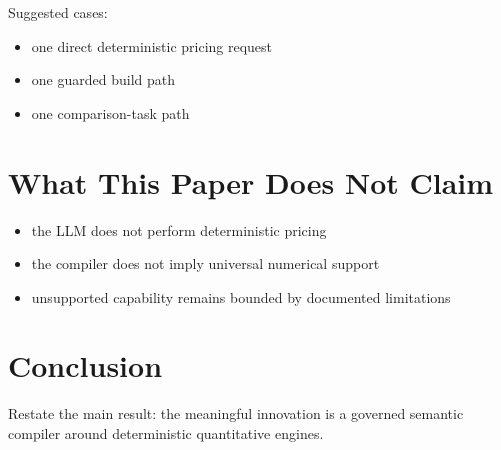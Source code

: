 \documentclass[11pt]{article}
\begin{document}
Suggested cases:
\begin{itemize}
    \item one direct deterministic pricing request
    \item one guarded build path
    \item one comparison-task path
\end{itemize}

\section{What This Paper Does Not Claim}

\begin{itemize}
    \item the LLM does not perform deterministic pricing
    \item the compiler does not imply universal numerical support
    \item unsupported capability remains bounded by documented limitations
\end{itemize}

\section{Conclusion}

Restate the main result: the meaningful innovation is a governed semantic
compiler around deterministic quantitative engines.
\end{document}
